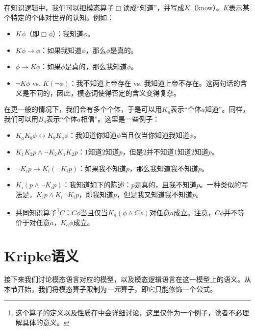 \begin{example}[知识逻辑]

在知识逻辑中，我们可以把模态算子$\Box$读成“知道”，并写成$K$（know）。$K$表示某个特定的个体对世界的认知。例如：

\begin{itemize}
    \item $K\phi$（即$\Box\phi$）：我知道$\phi$。
    \item $K\phi\to\phi$：如果我知道$\phi$，那么$\phi$是真的。
    \item $\phi\to K\phi$：如果$\phi$是真的，那么我知道$\phi$。
    \item $\neg K\phi$ vs. $K(\neg\phi)$：我不知道上帝存在 vs. 我知道上帝不存在。这两句话的含义是不同的，因此，模态词使得否定的含义变得复杂。
\end{itemize}

在更一般的情况下，我们会有多个个体，于是可以用$K_a$表示“个体$a$知道”。同样，我们可以用$B_a$表示“个体$a$相信”。这里是一些例子：

\begin{itemize}
    \item $K_aK_b\phi\leftrightarrow K_bK_a\phi$：我知道你知道$\phi$当且仅当你知道我知道$\phi$。
    \item $K_1K_2p\wedge \neg K_2K_1K_2 p$：$1$知道$2$知道$p$，但是$2$并不知道$1$知道$2$知道$p$。
    \item $\neg K_i p\to K_i(\neg K_i p)$：如果我不知道$p$，那么我知道我不知道$p$。
    \item $K_i(p\wedge\neg K_i p)$：我知道如下的陈述：$p$是真的，且我不知道$p$。一种类似的写法是，$K_ip\wedge K_i\neg K_ip$，即我知道$p$，但是我又知道我不知道$p$。
    \item 共同知识算子\footnote{这个算子的定义以及性质在中会详细讨论，这里仅作为一个例子，读者不必理解具体的意义。}$C$：$C \phi$当且仅当$K_a(\phi\wedge C\phi)$对任意$a$成立。注意，$C\phi$并不等价于对任意$a$，$K_a\phi$成立。
\end{itemize}
\end{example}

\section{Kripke语义}\label{sec:kripke-semantics}

接下来我们讨论模态语言对应的模型，以及模态逻辑语言在这一模型上的语义。从本节开始，我们将模态算子限制为\emph{一元}算子，即它只能修饰一个公式。

